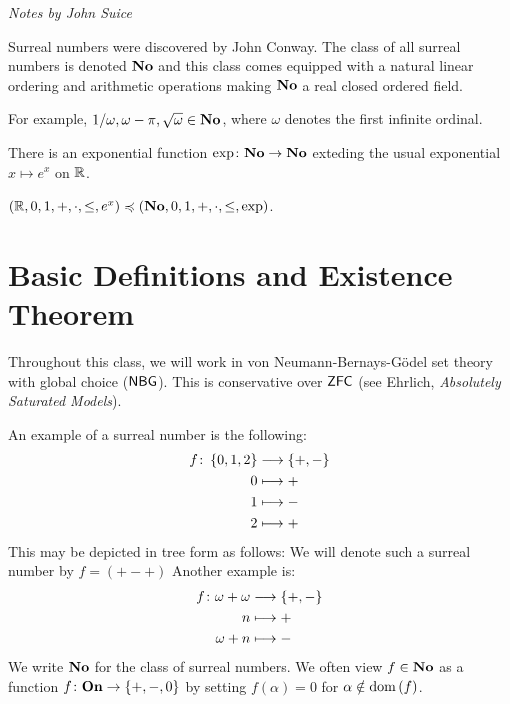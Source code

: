 \textit{Notes by John Suice}

Surreal numbers were discovered by John Conway. 
The class of all surreal numbers is denoted $\mathbf{No}$ and 
this class comes equipped with a natural linear ordering and 
arithmetic operations making $\mathbf{No}$ a real closed ordered field. 

For example, $1/ \omega, \omega - \pi, \sqrt{\omega} \in \mathbf{No}$, 
where $\omega$ denotes the first infinite ordinal. 

\begin{theorem}[Kruskal, 1980s]
	There is an exponential function $\exp \colon \mathbf{No} \rightarrow \mathbf{No}$
	exteding the usual exponential $x \mapsto e^x$ on $\mathbb{R}$. 
	\label{}
\end{theorem}

\begin{theorem}
	$(\mathbb{R}, 0, 1, +, \cdot, \leq, e^x) \preccurlyeq 
	(\mathbf{No}, 0, 1, +, \cdot, \leq, \exp)$. 	
	\label{}
\end{theorem}

\section{Basic Definitions and Existence Theorem}
Throughout this class, we will work in von Neumann-Bernays-G\"odel 
set theory with global choice ($\mathsf{NBG}$). This is conservative over 
$\mathsf{ZFC}$ (see Ehrlich, \emph{Absolutely Saturated Models}). 

An example of a surreal number is the following: 
\begin{align*}
	f \colon \left\{ 0, 1, 2 \right\} &\longrightarrow \left\{ +, - \right\} \\
	0 &\longmapsto + \\
	1 &\longmapsto - \\
	2 &\longmapsto +
\end{align*}
This may be depicted in tree form as follows:
We will denote such a surreal number by $f=(+-+)$
Another example is: 
\begin{align*}
	f \colon \omega + \omega &\longrightarrow \left\{ +, - \right\} \\
	n &\longmapsto + \\
	\omega + n &\longmapsto -
\end{align*}
We write $\mathbf{No}$ for the class of surreal numbers. We often view 
$f \in \mathbf{No}$ as a function $f \colon \mathbf{On} \rightarrow \left\{ +, -, 0 \right\}$ by 
setting $f(\alpha) = 0$ for $\alpha \notin \operatorname{dom}\left( f \right)$. 

